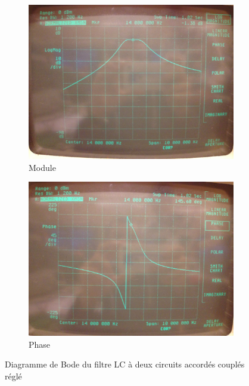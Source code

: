 \documentclass{article}
\begin{document}
\begin{figure}[h]
	\centering
	\begin{subfigure}[b]{0.43\textwidth}
		\centering
		\includegraphics[width=\textwidth]{bande_2MHz_bienregle}
		\caption{Module}
	\end{subfigure}
	\hfill
	\begin{subfigure}[b]{0.43\textwidth}
		\centering
		\includegraphics[width=\textwidth]{phase_bienregle}
		\caption{Phase}
	\end{subfigure}
	\caption{Diagramme de Bode du filtre LC à deux circuits accordés couplés réglé}
	\label{fig:LCregle}
\end{figure}
\end{document}
